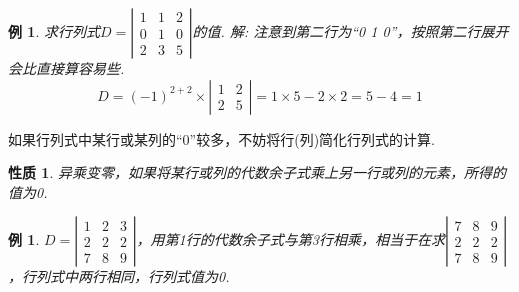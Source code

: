 \documentclass[12pt, a4paper, oneside]{ctexbook}
\newtheorem{example}[theorem]{例}
\newtheorem{quolity}[theorem]{性质}
\begin{document}
\begin{example}
    求行列式$D=\left | \begin{matrix}
        1 & 1 & 2 \\
        0 & 1 & 0 \\
        2 & 3 & 5
    \end{matrix} \right |$的值. 
    \newline
    解: 注意到第二行为``0 1 0''，按照第二行展开会比直接算容易些. 
    $$D=(-1)^{2 + 2} \times \left | \begin{matrix}
        1 & 2 \\
        2 & 5
    \end{matrix} \right | = 1 \times 5 - 2 \times 2 = 5 - 4 = 1$$
\end{example}

如果行列式中某行或某列的``0''较多，不妨将行(列)简化行列式的计算. 

\begin{quolity}
    异乘变零，如果将某行或列的代数余子式乘上另一行或列的元素，所得的值为0. 
\end{quolity}

\begin{example}
    $D=\left | \begin{matrix}
        1   & 2   & 3 \\
        2   & 2   & 2 \\
        7   & 8   & 9
    \end{matrix} \right |$，用第1行的代数余子式与第3行相乘，相当于在求$\left | \begin{matrix}
        7 & 8 & 9 \\
        2 & 2 & 2 \\
        7 & 8 & 9
    \end{matrix} \right |$，行列式中两行相同，行列式值为0. 
\end{example}
\end{document}
